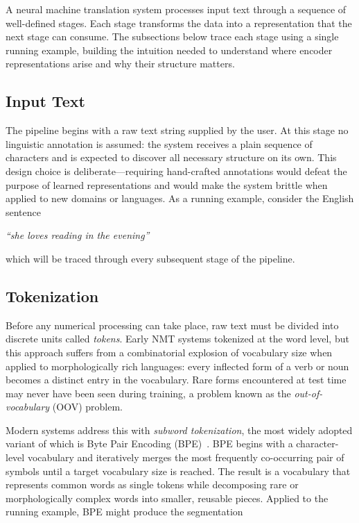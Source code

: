A neural machine translation system processes input text through a sequence of well-defined stages. Each stage transforms the data into a representation that the next stage can consume. The subsections below trace each stage using a single running example, building the intuition needed to understand where encoder representations arise and why their structure matters.

\subsection{Input Text}

The pipeline begins with a raw text string supplied by the user. At this stage no linguistic annotation is assumed: the system receives a plain sequence of characters and is expected to discover all necessary structure on its own. This design choice is deliberate---requiring hand-crafted annotations would defeat the purpose of learned representations and would make the system brittle when applied to new domains or languages. As a running example, consider the English sentence

\begin{center}
\textit{``she loves reading in the evening''}
\end{center}

\noindent which will be traced through every subsequent stage of the pipeline.

\subsection{Tokenization}

Before any numerical processing can take place, raw text must be divided into discrete units called \emph{tokens}. Early NMT systems tokenized at the word level, but this approach suffers from a combinatorial explosion of vocabulary size when applied to morphologically rich languages: every inflected form of a verb or noun becomes a distinct entry in the vocabulary. Rare forms encountered at test time may never have been seen during training, a problem known as the \emph{out-of-vocabulary} (OOV) problem.

Modern systems address this with \emph{subword tokenization}, the most widely adopted variant of which is Byte Pair Encoding (BPE)~\cite{sennrich-etal-2016-neural}. BPE begins with a character-level vocabulary and iteratively merges the most frequently co-occurring pair of symbols until a target vocabulary size is reached. The result is a vocabulary that represents common words as single tokens while decomposing rare or morphologically complex words into smaller, reusable pieces. Applied to the running example, BPE might produce the segmentation

